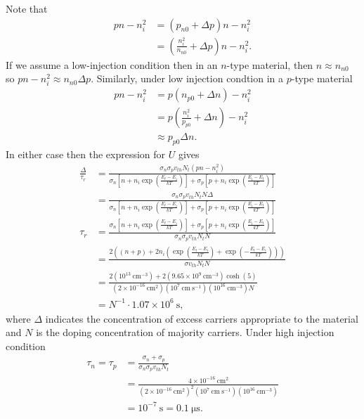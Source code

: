 \documentclass{article}
\begin{document}
Note that
\begin{align*}
pn - n_i^2 &= (p_{n0} + \Delta p)n - n_i^2 \\
           &= (\frac{n_i^2}{n_{n0}} + \Delta p)n - n_i^2.
\end{align*}
If we assume a low-injection condition then in an $n$-type material, 
then $n \approx n_{n0}$ so $pn - n_i^2 \approx n_{n0} \Delta p$. 
Similarly, under low injection condtion in a $p$-type material
\begin{align*}
pn - n_i^2 &= p(n_{p0} + \Delta n) - n_i^2 \\
           &= p(\frac{n_i^2}{p_{p0}} + \Delta n) - n_i^2 \\
           &\approx p_{p0} \Delta n.
\end{align*}
In either case then the expression for $U$ gives
\begin{align*}
  \frac{\Delta}{\tau_r} &= \frac{\sigma_n \sigma_p v_{th} N_t(pn - n_i^2)}
            {\sigma_n \left[n + n_i \exp\left(\frac{E_t - E_i}{kT}\right)\right]
          + \sigma_p \left[p + n_i \exp\left(\frac{E_i - E_t}{kT}\right)\right]} \\
    &= \frac{\sigma_n \sigma_p v_{th} N_t N \Delta}
           {\sigma_n \left[n + n_i \exp\left(\frac{E_t - E_i}{kT}\right)\right]
          + \sigma_p \left[p + n_i \exp\left(\frac{E_i - E_t}{kT}\right)\right]} \\
  \tau_r &= \frac{\sigma_n \left[n + n_i \exp\left(\frac{E_t - E_i}{kT}\right)\right]
          + \sigma_p \left[p + n_i \exp\left(\frac{E_i - E_t}{kT}\right)\right]} 
                 {\sigma_n \sigma_p v_{th} N_t N} \\
         &= \frac{2 ((n + p) + 2 n_i \left(\exp\left(\frac{E_t - E_i}{kT}\right) + \exp\left(-\frac{E_t - E_i}{kT}\right)\right))}
                 {\sigma v_{th} N_t N} \\
         &= \frac{2(10^{13} ~\mathrm{cm}^{-3}) 
           + 2(9.65 \times 10^9 ~\mathrm{cm}^{-3})\cosh(5)}
                 {(2 \times 10^{-16} ~\mathrm{cm}^2)
             (10^7 ~\mathrm{cm}~\mathrm{s}^{-1})
             (10^{16} ~\mathrm{cm}^{-3}) N
             } \\
         &= N^{-1} \cdot 1.07 \times 10^{6} ~\mathrm{s},
\end{align*}
where $\Delta$ indicates the concentration of excess carriers appropriate to 
the material and $N$ is the doping concentration of majority carriers.
Under high injection condition
\begin{align*}
\tau_n = \tau_p &= \frac{\sigma_n + \sigma_p}
                        {\sigma_n \sigma_p v_{th} N_t} \\
                &= \frac{4 \times 10^{-16} ~\mathrm{cm}^{2}}
                        {(2 \times 10^{-16} ~\mathrm{cm}^2)^2
                         (10^7 ~\mathrm{cm}~\mathrm{s}^{-1})
                         (10^{16}~\mathrm{cm}^{-3})} \\
                &= 10^{-7} ~\mathrm{s} = 0.1 ~\mathrm{\mu s}.
\end{align*}
\end{document}
